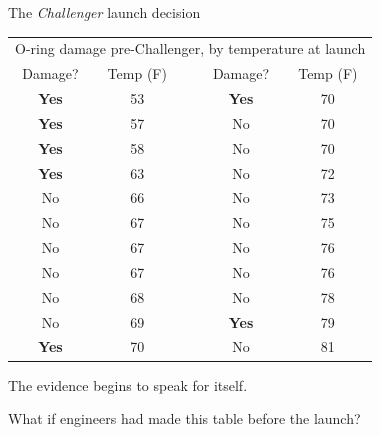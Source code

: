 \documentclass[11pt]{beamer}
\begin{document}
\begin{frame}{The \textit{Challenger} launch decision}
\begin{small}
\begin{scriptsize}
\begin{center}
\begin{tabular}{ccccc}
\toprule
\multicolumn{5}{c}{O-ring damage pre-Challenger, by temperature at launch}\\
Damage? &       Temp (F)        &       &       Damage? &       Temp (F)        \\
\midrule
\color{red} \textbf{Yes}        &       \color{red} 53  & \quad\quad\quad& \color{red} \textbf{Yes}     &       \color{red}70   \\
\color{red} \textbf{Yes}        &       \color{red}57   &       &       No       &       70      \\
\color{red} \textbf{Yes}        &       \color{red}58   &       &       No       &       70      \\
\color{red} \textbf{Yes}        &       \color{red}63   &       &       No       &       72      \\
No       &       66      &       &       No       &       73      \\
No       &       67      &       &       No       &       75      \\
No       &       67      &       &       No       &       76      \\
No       &       67      &       &       No       &       76      \\
No       &       68      &       &       No       &       78      \\
No       &       69      &       &       \color{red} \textbf{Yes}        &       \color{red}79   \\
\color{red} \textbf{Yes}        &       \color{red}70   &       &       No       &       81      \\
\bottomrule
\end{tabular}
\end{center}
\end{scriptsize} \pause
The evidence begins to speak for itself. \pause

What if engineers had made this table before the launch?

\end{small}
\end{frame}

\end{document}
